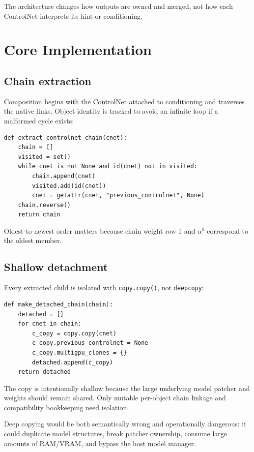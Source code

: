 \documentclass[11pt]{article}
\newcommand{\code}[1]{\texttt{#1}}
\begin{document}
The architecture changes how outputs are owned and merged, not how each ControlNet interprets its hint or conditioning.

\section{Core Implementation}

\subsection{Chain extraction}

Composition begins with the ControlNet attached to conditioning and traverses the native links. Object identity is tracked to avoid an infinite loop if a malformed cycle exists:

\begin{lstlisting}[style=pythonstyle,caption={Oldest-to-newest native-chain extraction.}]
def extract_controlnet_chain(cnet):
    chain = []
    visited = set()
    while cnet is not None and id(cnet) not in visited:
        chain.append(cnet)
        visited.add(id(cnet))
        cnet = getattr(cnet, "previous_controlnet", None)
    chain.reverse()
    return chain
\end{lstlisting}

Oldest-to-newest order matters because chain weight row 1 and $\alpha^0$ correspond to the oldest member.

\subsection{Shallow detachment}

Every extracted child is isolated with \code{copy.copy()}, not \code{deepcopy}:

\begin{lstlisting}[style=pythonstyle,caption={Shallow detachment.}]
def make_detached_chain(chain):
    detached = []
    for cnet in chain:
        c_copy = copy.copy(cnet)
        c_copy.previous_controlnet = None
        c_copy.multigpu_clones = {}
        detached.append(c_copy)
    return detached
\end{lstlisting}

The copy is intentionally shallow because the large underlying model patcher and weights should remain shared. Only mutable per-object chain linkage and compatibility bookkeeping need isolation.

Deep copying would be both semantically wrong and operationally dangerous: it could duplicate model structures, break patcher ownership, consume large amounts of RAM/VRAM, and bypass the host model manager.
\end{document}
